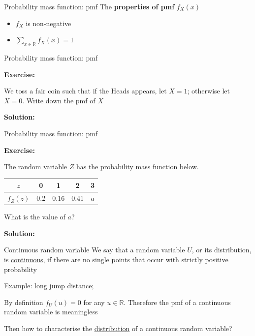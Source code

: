 \documentclass{beamer}
\begin{document}
\begin{frame}{Probability mass function: pmf}
The {\bf properties of pmf} $f_X(x)$
\begin{itemize}
\item $f_X$ is non-negative 
\item $\sum_{x\in \mathbb R}f_X(x)=1$
\end{itemize}
\end{frame}


\begin{frame}{Probability mass function: pmf}

{\bf Exercise: }

We toss a fair coin such that if the Heads appears, let $X=1$; otherwise let $X=0.$ Write down the pmf of $X$



{\bf Solution: }

\end{frame}

\begin{frame}{Probability mass function: pmf}

{\bf Exercise: }

The random variable $Z$ has the probability mass function below.
 \begin{center}
    \begin{tabular}{  c | c | c |c|c}
    \hline
    $z$  &0& 1&2&3 \\ \hline
    $f_Z(z)$ &0.2 &0.16 &0.41 &$a$\\
    \hline
    \end{tabular}
\end{center}
What is the value of $a$?



{\bf Solution:}

\end{frame}


\begin{frame}{Continuous random variable}
We say that a random variable \(U\), or its distribution, is \underline{continuous}, if there are no single points that occur with strictly positive probability 

Example:  long jump distance; 



By definition $f_U(u)=0$ for any $u\in \mathbb R$. Therefore the pmf of a continuous random variable is meaningless 


Then how to characterise the \underline{distribution} of a continuous random variable? 

\end{frame}
\end{document}
